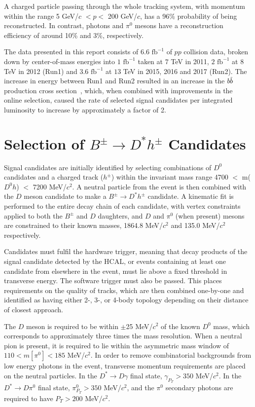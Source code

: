 \documentclass[oneside,12pt]{article}
\newcommand{\overbar}[1]{\mkern 1.5mu\overline{\mkern-1.5mu#1\mkern-1.5mu}\mkern
1.5mu}
\begin{document}
A charged particle passing through the whole tracking system, with momentum
within the range 5 GeV/$c$ $< p <$ 200 GeV/$c$, has a 96\% probability of being
reconstructed. In contrast, photons and $\pi^0$ mesons have a reconstruction
efficiency of around 10\% and 3\%, respectively.

The data presented in this report consists of $6.6$ $\text{fb}^{-1}$ of $pp$
collision data, broken down by center-of-mass energies into $1$ $\text{fb}^{-1}$ taken at $7$ TeV in 2011, $2$
$\text{fb}^{-1}$ at $8$ TeV in 2012 (Run1) and $3.6$ $\text{fb}^{-1}$ at $13$
TeV in 2015, 2016 and 2017 (Run2). The increase in energy between Run1 and Run2
resulted in an increase in the $b\overbar{b}$ production cross
section~\cite{PDG2018}, which, when combined with improvements in the online
selection, caused the rate of selected signal candidates per integrated
luminosity to increase by approximately a factor of 2.

\vspace{-3mm}
\section{Selection of $B^{\pm}\rightarrow D^*h^{\pm}$ Candidates} \label{sec:selections}

Signal candidates are initially identified by selecting combinations of $D^0$
candidates and a charged track ($h^{\pm}$) within the invariant mass range 4700
$<$ m($D^0h$) $<$ 7200 MeV/$c^2$. A neutral particle from the event is then
combined with the $D$ meson candidate to make a $B^{\pm}\rightarrow D^*h^{\pm}$
candidate. A kinematic fit is performed to the entire decay chain of each
candidate, with vertex constraints applied to both the $B^{\pm}$ and $D$
daughters, and $D$ and $\pi^0$ (when present) mesons are constrained to their
known masses, 1864.8 MeV/$c^2$ and 135.0 MeV/$c^2$ respectively.

Candidates must fulfil the hardware trigger, meaning that decay products of the
signal candidate detected by the HCAL, or events containing at least one
candidate from elsewhere in the event, must lie above a fixed threshold in
transverse energy.  The software trigger must also be passed. This places
requirements on the quality of tracks, which are then combined one-by-one and
identified as having either 2-, 3-, or 4-body topology depending on their
distance of closest approach. 

The $D$ meson is required to be within $\pm$25 MeV/$c^2$ of the known $D^0$
mass, which corresponds to approximately three times the mass resolution.  When
a neutral pion is present, it is required to lie within the asymmetric mass
window of $110 < m[\pi^0] < 185$ MeV/$c^2$. In order to remove combinatorial
backgrounds from low energy photons in the event, transverse momentum
requirements are placed on the neutral particles. In the $D^*\rightarrow
D\gamma$ final state, $\gamma_{P_T}>350$ MeV/$c^2$. In the $D^*\rightarrow
D\pi^0$ final state, $\pi^0_{P_T}>350$ MeV/$c^2$, and the $\pi^0$ secondary
photons are required to have $P_T>200$ MeV/$c^2$.
\end{document}
